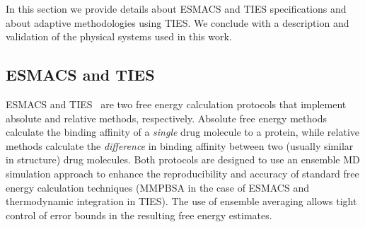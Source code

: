 In this section we provide details about ESMACS and TIES specifications and
about adaptive methodologies using TIES\@. We conclude with a description and
validation of the physical systems used in this work.





\subsection{ESMACS and TIES}\label{ssec:esm_ties}

ESMACS and TIES~\cite{Wan2017brd4, Bhati2017} are two free energy calculation
protocols that implement absolute and relative methods, respectively.
Absolute free energy methods calculate the binding affinity of a
\emph{single} drug molecule to a protein, while relative methods calculate
the \emph{difference} in binding affinity between two (usually similar in
structure) drug molecules. 
Both protocols are designed to use an ensemble MD simulation approach to enhance the reproducibility and accuracy of standard free energy calculation techniques (MMPBSA \cite{Massova1999} in the case of ESMACS and thermodynamic integration \cite{Straatsma1988, Straatsma1991} in TIES).
The use of ensemble averaging allows tight control of error bounds in the resulting free energy estimates.

